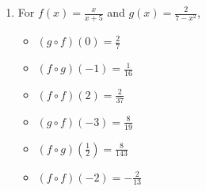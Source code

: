 \begin{enumerate}
\begin{multicols}{3}
\begin{itemize}
\item  $(f\circ g)(-1) = 1$

\item  $(f \circ f)(2) = \frac{3}{4}$

\end{itemize}

\end{multicols}

\begin{multicols}{3}

\begin{itemize}

\item  $(g\circ f)(-3) = \frac{48}{25}$

\item  $(f\circ g)\left(\frac{1}{2}\right) = -5$

\item  $(f \circ f)(-2)$ is undefined

\end{itemize}

\end{multicols}

\item  For  $f(x) = \frac{x}{x+5}$ and $g(x) = \frac{2}{7-x^2}$,
\begin{multicols}{3}

\begin{itemize}

\item  $(g\circ f)(0) = \frac{2}{7}$

\item  $(f\circ g)(-1) = \frac{1}{16}$

\item  $(f \circ f)(2) = \frac{2}{37}$

\end{itemize}

\end{multicols}

\begin{multicols}{3}

\begin{itemize}

\item  $(g\circ f)(-3) = \frac{8}{19}$

\item  $(f\circ g)\left(\frac{1}{2}\right) = \frac{8}{143}$

\item  $(f \circ f)(-2) = -\frac{2}{13}$


\end{itemize}
\end{multicols}
\end{enumerate}
